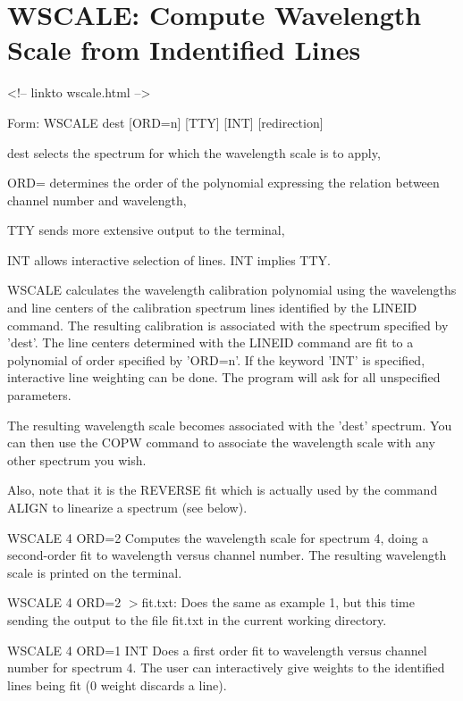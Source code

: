 \section{WSCALE: Compute Wavelength Scale from Indentified Lines}
\begin{rawhtml}
<!-- linkto wscale.html -->
\end{rawhtml}
\begin{command}
  \item[Form: WSCALE dest {[ORD=n]} {[TTY]} {[INT]} {[redirection]}\hfill]{}
  \item[dest]{selects the spectrum for which the wavelength scale is to apply,}
  \item[ORD=]{determines the order of the polynomial 
       expressing the relation between channel number and wavelength,}
  \item[TTY]{sends more extensive output to the terminal,}
  \item[INT]{allows interactive selection of lines.  INT implies TTY.}
\end{command}

WSCALE calculates the wavelength calibration polynomial using the
wavelengths and line centers of the calibration spectrum lines identified
by the LINEID command.  The resulting calibration is associated with the
spectrum specified by 'dest'. The line centers determined with the LINEID
command are fit to a polynomial of order specified by 'ORD=n'. If the
keyword 'INT' is specified, interactive line weighting can be done. The
program will ask for all unspecified parameters.

The resulting wavelength scale becomes associated with the 'dest'
spectrum. You can then use the COPW command to associate the wavelength
scale with any other spectrum you wish.

Also, note that it is the REVERSE fit which is actually used by the command
ALIGN to linearize a spectrum (see below).

\begin{example}
  \item[WSCALE 4 ORD=2\hfill]{ Computes the wavelength scale for spectrum
       4, doing a second-order fit to wavelength versus channel number. The
       resulting wavelength scale is printed on the terminal.}

  \item[WSCALE 4 ORD=2 $>$fit.txt:\hfill]{ Does the same as example 1, but
       this time sending the output to the file fit.txt in the
       current working directory.}

  \item[WSCALE 4 ORD=1 INT\hfill]{ Does a first order fit to wavelength
       versus channel number for spectrum 4.  The user can interactively
       give weights to the identified lines being fit (0 weight discards a
       line).}
\end{example}


